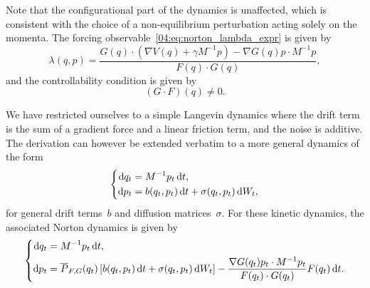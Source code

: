 Note that the configurational part of the dynamics is unaffected, which is consistent with the choice of a non-equilibrium perturbation acting solely on the momenta.
The forcing observable~\eqref{04:eq:norton_lambda_expr} is given by
\begin{equation}
    \label{04:eq:norton_lambda_langevin}
    \lambda(q,p) = \frac{G(q)\cdot(\nabla V(q) + \gamma M^{-1}p) -\nabla G(q) p \cdot M^{-1}p}{F(q)\cdot G(q)},
\end{equation}
and the controllability condition is given by
\begin{equation}
    \label{04:eq:norton_langevin_controllability}
    (G\cdot F)(q) \neq 0.
\end{equation}
\begin{remark}
We have restricted ourselves to a simple Langevin dynamics where the drift term is the sum of a gradient force and a linear friction term, and the noise is additive. The derivation can however be extended verbatim to a more general dynamics of the form
\begin{equation*}
    \left\{\begin{aligned}
        \mathrm{d} q_t&=M^{-1}p_t\,\mathrm{d} t,\\
        \mathrm{d} p_t&=b(q_t,p_t)\,\mathrm{d} t + \sigma(q_t,p_t)\,\mathrm{d} W_t,
    \end{aligned}\right.
\end{equation*}
for general drift terms~$b$ and diffusion matrices~$\sigma$.
For these kinetic dynamics, the associated Norton dynamics is given by
\begin{equation*}
    \left\{\begin{aligned}
        \mathrm{d} q_t&=M^{-1}p_t\,\mathrm{d} t,\\
        \mathrm{d} p_t&=\overline{P}_{F,G}(q_t)\left[b(q_t,p_t)\,\mathrm{d} t + \sigma(q_t,p_t)\,\mathrm{d} W_t\right]-\frac{\nabla G(q_t)p_t\cdot M^{-1}p_t}{F(q_t)\cdot G(q_t)}F(q_t)\,\mathrm{d} t.
    \end{aligned}\right.
\end{equation*}
\end{remark}


